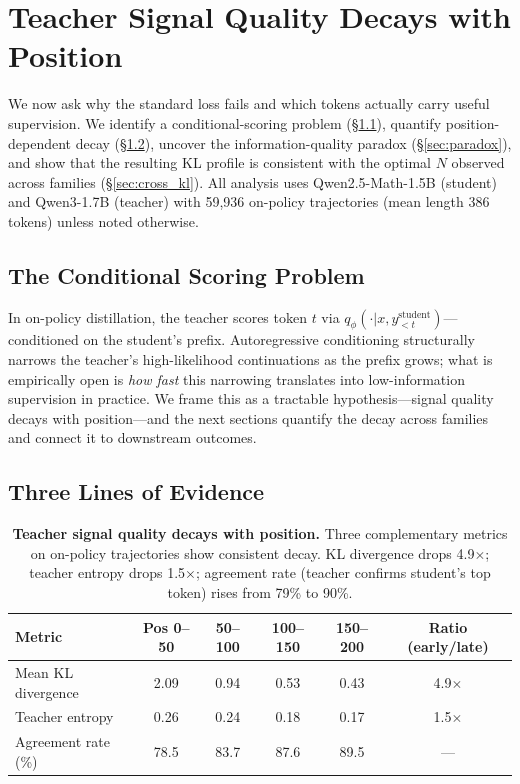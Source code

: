 \documentclass[10pt]{article}
\begin{document}
\section{Teacher Signal Quality Decays with Position}
\label{sec:analysis}

We now ask why the standard loss fails and which tokens actually carry useful supervision. We identify a conditional-scoring problem (\S\ref{sec:conditional}), quantify position-dependent decay (\S\ref{sec:evidence}), uncover the information-quality paradox (\S\ref{sec:paradox}), and show that the resulting KL profile is consistent with the optimal $N$ observed across families (\S\ref{sec:cross_kl}). All analysis uses Qwen2.5-Math-1.5B (student) and Qwen3-1.7B (teacher) with 59,936 on-policy trajectories (mean length 386 tokens) unless noted otherwise.

\subsection{The Conditional Scoring Problem}
\label{sec:conditional}

In on-policy distillation, the teacher scores token $t$ via $q_\phi(\cdot | x, y_{<t}^{\text{student}})$---conditioned on the student's prefix.
Autoregressive conditioning structurally narrows the teacher's high-likelihood continuations as the prefix grows; what is empirically open is \emph{how fast} this narrowing translates into low-information supervision in practice. We frame this as a tractable hypothesis---signal quality decays with position---and the next sections quantify the decay across families and connect it to downstream outcomes.

\subsection{Three Lines of Evidence}
\label{sec:evidence}

\begin{table}[t]
\centering
\caption{\textbf{Teacher signal quality decays with position.} Three complementary metrics on on-policy trajectories show consistent decay. KL divergence drops 4.9$\times$; teacher entropy drops 1.5$\times$; agreement rate (teacher confirms student's top token) rises from 79\% to 90\%.}
\label{tab:decay}
\small
\begin{tabular}{@{}lccccc@{}}
\toprule
\textbf{Metric} & \textbf{Pos 0--50} & \textbf{50--100} & \textbf{100--150} & \textbf{150--200} & \textbf{Ratio (early/late)} \\
\midrule
Mean KL divergence      & 2.09 & 0.94 & 0.53 & 0.43 & 4.9$\times$ \\
Teacher entropy          & 0.26 & 0.24 & 0.18 & 0.17 & 1.5$\times$ \\
Agreement rate (\%)     & 78.5 & 83.7 & 87.6 & 89.5 & --- \\
\bottomrule
\end{tabular}
\end{table}
\end{document}
